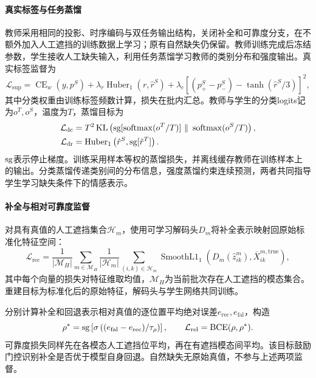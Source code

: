 \paragraph{真实标签与任务蒸馏}
教师采用相同的投影、时序编码与双任务输出结构，关闭补全和可靠度分支，在不额外加入人工遮挡的训练数据上学习；原有自然缺失仍保留。教师训练完成后冻结参数，学生接收人工缺失输入，利用任务蒸馏\cite{ref:kd}学习教师的类别分布和强度输出。真实标签监督为
\begin{equation}
\mathcal L_{\mathrm{sup}}=\operatorname{CE}_{w}(y,p^S)
+\lambda_r\operatorname{Huber}_1(r,\hat r^S)
+\lambda_c\left[(p^S_{+}-p^S_{-})-\tanh(\hat r^S/3)\right]^2,
\end{equation}
其中分类权重由训练标签频数计算，损失在批内汇总。教师与学生的分类logits记为$o^T,o^S$，温度为$T$，蒸馏目标为
\begin{align}
\mathcal L_{\mathrm{dc}}&=T^2\operatorname{KL}\left(
\sg[\operatorname{softmax}(o^T/T)]\ \|\ \operatorname{softmax}(o^S/T)\right),\\
\mathcal L_{\mathrm{dr}}&=\operatorname{Huber}_1\left(\hat r^S,\sg[\hat r^T]\right).
\end{align}
$\operatorname{sg}$表示停止梯度。训练采用样本等权的蒸馏损失，并离线缓存教师在训练样本上的输出。分类蒸馏传递类别间的分布信息，强度蒸馏约束连续预测，两者共同指导学生学习缺失条件下的情感表示。

\paragraph{补全与相对可靠度监督}
对具有真值的人工遮挡集合$\mathcal H_m$，使用可学习解码头$D_m$将补全表示映射回原始标准化特征空间：
\begin{equation}
\mathcal L_{\mathrm{rec}}=\frac{1}{|\mathcal M_H|}\sum_{m\in\mathcal M_H}
\frac{1}{|\mathcal H_m|}\sum_{(i,k)\in\mathcal H_m}
\operatorname{SmoothL1}_1\left(D_m(\hat z^m_{ik}),\bar X^{m,\mathrm{true}}_{ik}\right),
\end{equation}
其中每个向量的损失对特征维取均值，$\mathcal M_H$为当前批次存在人工遮挡的模态集合。重建目标为标准化后的原始特征，解码头与学生网络共同训练。

分别计算补全和回退表示相对真值的逐位置平均绝对误差$e_{\mathrm{rec}},e_{\mathrm{fal}}$，构造
\begin{equation}
\rho^*=\operatorname{sg}\left[\sigma\left((e_{\mathrm{fal}}-e_{\mathrm{rec}})/\tau_{\rho}\right)\right],\qquad
\mathcal L_{\mathrm{rel}}=\operatorname{BCE}(\rho,\rho^*).
\end{equation}
可靠度损失同样先在各模态人工遮挡位平均，再在有遮挡模态间平均。该目标鼓励门控识别补全是否优于模型自身回退。自然缺失无原始真值，不参与上述两项监督。

